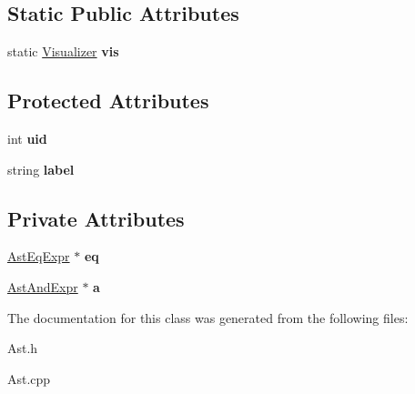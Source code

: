 \subsection*{Static Public Attributes}
\begin{DoxyCompactItemize}
\item 
\hypertarget{classAST_aca9e6637209b31e03a09c0d42f29bdfa}{static \hyperlink{classVisualizer}{Visualizer} {\bfseries vis}}\label{classAST_aca9e6637209b31e03a09c0d42f29bdfa}

\end{DoxyCompactItemize}
\subsection*{Protected Attributes}
\begin{DoxyCompactItemize}
\item 
\hypertarget{classAST_a847b778f1c3dd5a19de32de432ee6e15}{int {\bfseries uid}}\label{classAST_a847b778f1c3dd5a19de32de432ee6e15}

\item 
\hypertarget{classAST_ab2e239ccc0688d2341724432ff5a1a31}{string {\bfseries label}}\label{classAST_ab2e239ccc0688d2341724432ff5a1a31}

\end{DoxyCompactItemize}
\subsection*{Private Attributes}
\begin{DoxyCompactItemize}
\item 
\hypertarget{classAstAndExpr_aec33f836a7d0f47cf78bc11043935313}{\hyperlink{classAstEqExpr}{Ast\-Eq\-Expr} $\ast$ {\bfseries eq}}\label{classAstAndExpr_aec33f836a7d0f47cf78bc11043935313}

\item 
\hypertarget{classAstAndExpr_ab9f16e8ea62625a5d66792a08b6a3ae2}{\hyperlink{classAstAndExpr}{Ast\-And\-Expr} $\ast$ {\bfseries a}}\label{classAstAndExpr_ab9f16e8ea62625a5d66792a08b6a3ae2}

\end{DoxyCompactItemize}


The documentation for this class was generated from the following files\-:\begin{DoxyCompactItemize}
\item 
Ast.\-h\item 
Ast.\-cpp\end{DoxyCompactItemize}
